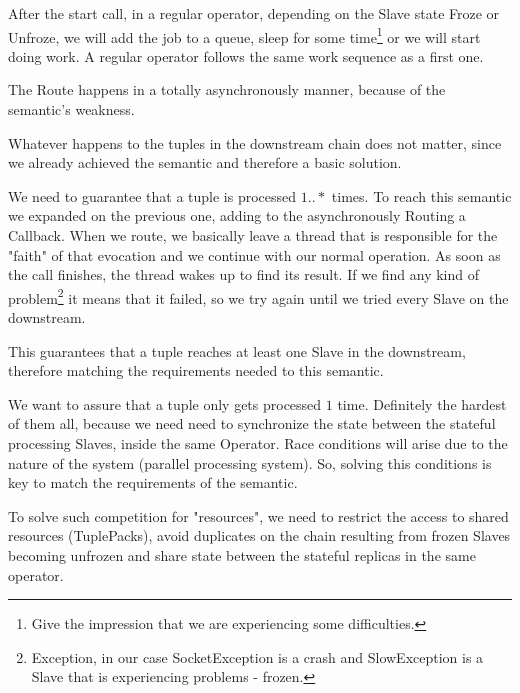 \documentclass[times, 10pt,twocolumn]{article}
\begin{document}
After the start call, in a regular operator, depending on the Slave state Froze or Unfroze, we will add the job to a queue, sleep for some time\footnote
{%
	Give the impression that we are experiencing some difficulties.
}  
or we will start doing work. A regular operator follows the same work sequence as a first one.

The Route happens in a totally asynchronously manner, because of the semantic's weakness. 

Whatever happens to the tuples in the downstream chain does not matter, since we already achieved the semantic and therefore a basic solution.


We need to guarantee that a tuple is processed $1..*$ times. To reach this semantic we expanded on the previous one, adding to the asynchronously Routing a Callback. When we route, we basically leave a thread that is responsible for the "faith" of that evocation and we continue with our normal operation. As soon as the call finishes, the thread wakes up to find its result. If we find any kind of problem\footnote
{%
	Exception, in our case SocketException is a crash and SlowException is a Slave that is experiencing problems - frozen.
}   
it means that it failed, so we try again until we tried every Slave on the downstream. 

This guarantees that a tuple reaches at least one Slave in the downstream, therefore matching the requirements needed to this semantic.



We want to assure that a tuple only gets processed $1$ time. Definitely the hardest of them all, because we need need to synchronize the state between the stateful processing Slaves, inside the same Operator. Race conditions will arise due to the nature of the system (parallel processing system). So, solving this conditions is key to match the requirements of the semantic. 

To solve such competition for "resources", we need to restrict the access to shared resources (TuplePacks), avoid duplicates on the chain resulting from frozen Slaves becoming unfrozen and share state between the stateful replicas in the same operator.
\end{document}
